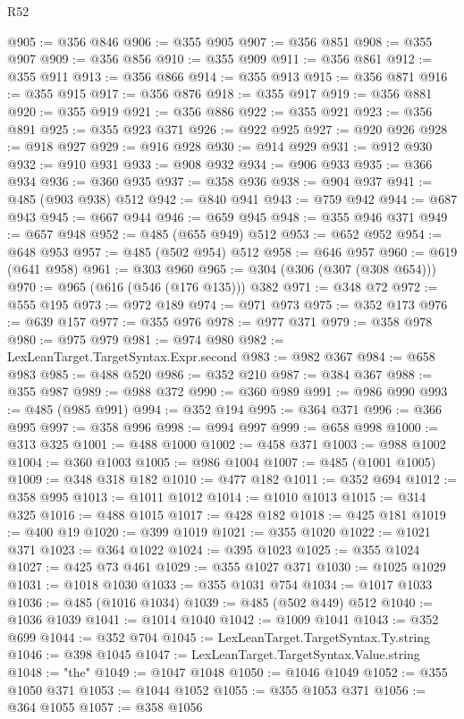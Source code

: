 \begin{lexlean}{R52}
\begin{coremodule}
@905 := @356 @846
@906 := @355 @905
@907 := @356 @851
@908 := @355 @907
@909 := @356 @856
@910 := @355 @909
@911 := @356 @861
@912 := @355 @911
@913 := @356 @866
@914 := @355 @913
@915 := @356 @871
@916 := @355 @915
@917 := @356 @876
@918 := @355 @917
@919 := @356 @881
@920 := @355 @919
@921 := @356 @886
@922 := @355 @921
@923 := @356 @891
@925 := @355 @923 @371
@926 := @922 @925
@927 := @920 @926
@928 := @918 @927
@929 := @916 @928
@930 := @914 @929
@931 := @912 @930
@932 := @910 @931
@933 := @908 @932
@934 := @906 @933
@935 := @366 @934
@936 := @360 @935
@937 := @358 @936
@938 := @904 @937
@941 := @485 (@903 @938) @512
@942 := @840 @941
@943 := @759 @942
@944 := @687 @943
@945 := @667 @944
@946 := @659 @945
@948 := @355 @946 @371
@949 := @657 @948
@952 := @485 (@655 @949) @512
@953 := @652 @952
@954 := @648 @953
@957 := @485 (@502 @954) @512
@958 := @646 @957
@960 := @619 (@641 @958)
@961 := @303 @960
@965 := @304 (@306 (@307 (@308 @654)))
@970 := @965 (@616 (@546 (@176 @135))) @382
@971 := @348 @72
@972 := @555 @195
@973 := @972 @189
@974 := @971 @973
@975 := @352 @173
@976 := @639 @157
@977 := @355 @976
@978 := @977 @371
@979 := @358 @978
@980 := @975 @979
@981 := @974 @980
@982 := LexLeanTarget.TargetSyntax.Expr.second
@983 := @982 @367
@984 := @658 @983
@985 := @488 @520
@986 := @352 @210
@987 := @384 @367
@988 := @355 @987
@989 := @988 @372
@990 := @360 @989
@991 := @986 @990
@993 := @485 (@985 @991)
@994 := @352 @194
@995 := @364 @371
@996 := @366 @995
@997 := @358 @996
@998 := @994 @997
@999 := @658 @998
@1000 := @313 @325
@1001 := @488 @1000
@1002 := @458 @371
@1003 := @988 @1002
@1004 := @360 @1003
@1005 := @986 @1004
@1007 := @485 (@1001 @1005)
@1009 := @348 @318 @182
@1010 := @477 @182
@1011 := @352 @694
@1012 := @358 @995
@1013 := @1011 @1012
@1014 := @1010 @1013
@1015 := @314 @325
@1016 := @488 @1015
@1017 := @428 @182
@1018 := @425 @181
@1019 := @400 @19
@1020 := @399 @1019
@1021 := @355 @1020
@1022 := @1021 @371
@1023 := @364 @1022
@1024 := @395 @1023
@1025 := @355 @1024
@1027 := @425 @73 @461
@1029 := @355 @1027 @371
@1030 := @1025 @1029
@1031 := @1018 @1030
@1033 := @355 @1031 @754
@1034 := @1017 @1033
@1036 := @485 (@1016 @1034)
@1039 := @485 (@502 @449) @512
@1040 := @1036 @1039
@1041 := @1014 @1040
@1042 := @1009 @1041
@1043 := @352 @699
@1044 := @352 @704
@1045 := LexLeanTarget.TargetSyntax.Ty.string
@1046 := @398 @1045
@1047 := LexLeanTarget.TargetSyntax.Value.string
@1048 := "the"
@1049 := @1047 @1048
@1050 := @1046 @1049
@1052 := @355 @1050 @371
@1053 := @1044 @1052
@1055 := @355 @1053 @371
@1056 := @364 @1055
@1057 := @358 @1056

\end{coremodule}
\end{lexlean}
